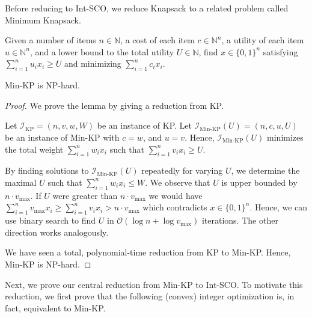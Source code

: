 Before reducing to Int-SCO, we reduce Knapsack to a related problem called Minimum Knapsack.

\begin{problem}
Given a number of items $n \in \mathbb{N}$, a cost of each item $c \in \mathbb{N}^n$, a utility of each item $u \in \mathbb{N}^n$, and a lower bound to the total utility $U \in \mathbb{N}$, find $x \in \{0,1\}^n$ satisfying $\sum_{i = 1}^n u_i x_i \geq U$ and minimizing $\sum_{i=1}^n c_i x_i$.
\end{problem}

\begin{lemma}
Min-KP is NP-hard.
\end{lemma}
\begin{proof}
We prove the lemma by giving a reduction from KP.

Let $\mathcal{I}_{\text{KP}} = (n, v, w, W)$ be an instance of KP. Let $\mathcal{I}_{\text{Min-KP}}(U) = (n, c, u, U)$ be an instance of Min-KP with $c = w$, and $u = v$. Hence, $\mathcal{I}_{\text{Min-KP}}(U)$ minimizes the total weight $\sum_{i=1}^n w_i x_i$ such that $\sum_{i=1}^n v_i x_i \geq U$.

By finding solutions to $\mathcal{I}_{\text{Min-KP}}(U)$ repeatedly for varying $U$, we determine the maximal $U$ such that $\sum_{i=1}^n w_i x_i \leq W$. We observe that $U$ is upper bounded by $n \cdot v_{\text{max}}$. If $U$ were greater than $n \cdot v_{\text{max}}$ we would have $\sum_{i=1}^n v_{\text{max}} x_i \geq \sum_{i=1}^n v_i x_i > n \cdot v_{\text{max}}$ which contradicts $x \in \{0,1\}^n$. Hence, we can use binary search to find $U$ in $\mathcal{O}(\log n + \log v_{\text{max}})$ iterations. The other direction works analogously.

We have seen a total, polynomial-time reduction from KP to Min-KP. Hence, Min-KP is NP-hard.
\end{proof}

Next, we prove our central reduction from Min-KP to Int-SCO. To motivate this reduction, we first prove that the following (convex) integer optimization is, in fact, equivalent to Min-KP.

